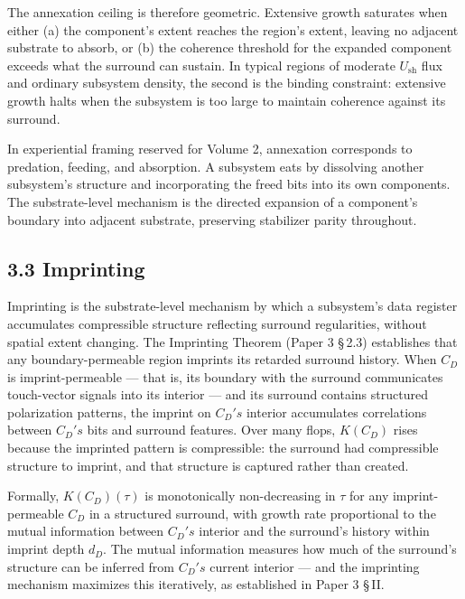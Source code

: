 \documentclass[11pt,oneside]{report}
\theoremstyle{definition}
\theoremstyle{remark}
\begin{document}
The annexation ceiling is therefore geometric. Extensive growth
saturates when either (a) the component's extent reaches the region's
extent, leaving no adjacent substrate to absorb, or (b) the coherence
threshold for the expanded component exceeds what the surround can
sustain. In typical regions of moderate \ensuremath{U_{\mathrm{sh}}} flux and ordinary subsystem
density, the second is the binding constraint: extensive growth halts
when the subsystem is too large to maintain coherence against its
surround.

In experiential framing reserved for Volume 2, annexation corresponds to
predation, feeding, and absorption. A subsystem eats by dissolving
another subsystem's structure and incorporating the freed bits into its
own components. The substrate-level mechanism is the directed expansion
of a component's boundary into adjacent substrate, preserving stabilizer
parity throughout.

\subsection*{3.3 Imprinting}

Imprinting is the substrate-level mechanism by which a subsystem's data
register accumulates compressible structure reflecting surround
regularities, without spatial extent changing. The Imprinting Theorem
(Paper 3 \S\,2.3) establishes that any boundary-permeable region imprints
its retarded surround history. When \ensuremath{C_{D}} is imprint-permeable --- that
is, its boundary with the surround communicates touch-vector signals
into its interior --- and its surround contains structured polarization
patterns, the imprint on \ensuremath{C_{D}'s} interior accumulates correlations
between \ensuremath{C_{D}'s} bits and surround features. Over many flops, \ensuremath{K(C_{D})}
rises because the imprinted pattern is compressible: the surround had
compressible structure to imprint, and that structure is captured rather
than created.

Formally, \ensuremath{K(C_{D})(\tau )} is monotonically non-decreasing in \ensuremath{\tau} for any
imprint-permeable \ensuremath{C_{D}} in a structured surround, with growth rate
proportional to the mutual information between \ensuremath{C_{D}'s} interior and the
surround's history within imprint depth \ensuremath{d_{D}.} The mutual information
measures how much of the surround's structure can be inferred from
\ensuremath{C_{D}'s} current interior --- and the imprinting mechanism maximizes this
iteratively, as established in Paper 3 \S\,II.
\end{document}
